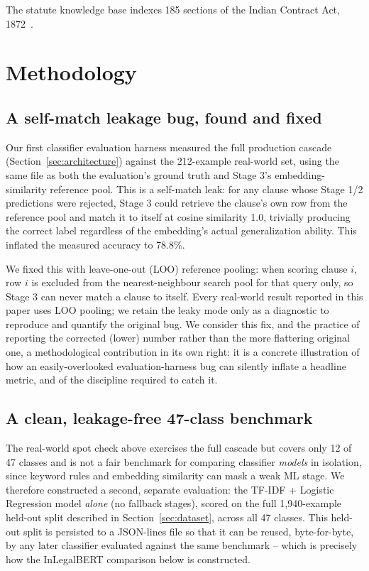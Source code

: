 \documentclass[conference]{IEEEtran}
\begin{document}
The statute knowledge base indexes 185 sections of the Indian Contract Act, 1872~\cite{ica1872}.

\section{Methodology}
\label{sec:methodology}

\subsection{A self-match leakage bug, found and fixed}
\label{sec:leak}

Our first classifier evaluation harness measured the full production cascade (Section~\ref{sec:architecture}) against the 212-example real-world set, using the same file as both the evaluation's ground truth and Stage 3's embedding-similarity reference pool. This is a self-match leak: for any clause whose Stage 1/2 predictions were rejected, Stage 3 could retrieve the clause's own row from the reference pool and match it to itself at cosine similarity 1.0, trivially producing the correct label regardless of the embedding's actual generalization ability. This inflated the measured accuracy to 78.8\%.

We fixed this with leave-one-out (LOO) reference pooling: when scoring clause $i$, row $i$ is excluded from the nearest-neighbour search pool for that query only, so Stage 3 can never match a clause to itself. Every real-world result reported in this paper uses LOO pooling; we retain the leaky mode only as a diagnostic to reproduce and quantify the original bug. We consider this fix, and the practice of reporting the corrected (lower) number rather than the more flattering original one, a methodological contribution in its own right: it is a concrete illustration of how an easily-overlooked evaluation-harness bug can silently inflate a headline metric, and of the discipline required to catch it.

\subsection{A clean, leakage-free 47-class benchmark}

The real-world spot check above exercises the full cascade but covers only 12 of 47 classes and is not a fair benchmark for comparing classifier \emph{models} in isolation, since keyword rules and embedding similarity can mask a weak ML stage. We therefore constructed a second, separate evaluation: the TF-IDF + Logistic Regression model \emph{alone} (no fallback stages), scored on the full 1{,}940-example held-out split described in Section~\ref{sec:dataset}, across all 47 classes. This held-out split is persisted to a JSON-lines file so that it can be reused, byte-for-byte, by any later classifier evaluated against the same benchmark -- which is precisely how the InLegalBERT comparison below is constructed.
\end{document}
